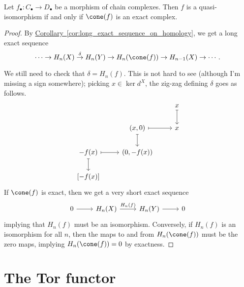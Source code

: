\documentclass[main.tex]{subfiles}
\begin{document}
\begin{corollary}
  \label{cor:cone_controls_quasi_isomorphism}
  Let $f_{\bullet}\colon C_{\bullet} \to D_{\bullet}$ be a morphism of chain complexes. Then $f$ is a quasi-isomorphism if and only if $\cone(f)$ is an exact complex.
\end{corollary}
\begin{proof}
  By \hyperref[cor:long_exact_sequence_on_homology]{Corollary~\ref*{cor:long_exact_sequence_on_homology}}, we get a long exact sequence
  \begin{equation*}
    \cdots \to  H_{n}(X) \overset{\delta}{\to} H_{n}(Y) \to H_{n}(\cone(f)) \to H_{n-1}(X) \to \cdots.
  \end{equation*}

  We still need to check that $\delta = H_{n}(f)$. This is not hard to see (although I'm missing a sign somewhere); picking $x \in \ker d^{X}$, the zig-zag defining $\delta$ goes as follows.
  \begin{equation*}
    \begin{tikzcd}
      && x
      \arrow[d, mapsto]
      \\
      & (x, 0)
      \arrow[r, mapsto]
      \arrow[d, mapsto]
      & x
      \\
      -f(x)
      \arrow[r, mapsto]
      \arrow[d, mapsto]
      & (0, -f(x))
      \\
      {[-f(x)]}
    \end{tikzcd}
  \end{equation*}
  If $\cone(f)$ is exact, then we get a very short exact sequence
  \begin{equation*}
    \begin{tikzcd}
      0
      \arrow[r]
      & H_{n}(X)
      \arrow[r, "H_{n}(f)"]
      & H_{n}(Y)
      \arrow[r]
      & 0
    \end{tikzcd}
  \end{equation*}
  implying that $H_{n}(f)$ must be an isomorphism. Conversely, if $H_{n}(f)$ is an isomorphism for all $n$, then the maps to and from $H_{n}(\cone(f))$ must be the zero maps, implying $H_{n}(\cone(f)) = 0$ by exactness.
\end{proof}

\section{The Tor functor}
\label{sec:the_tor_functor}
\end{document}

